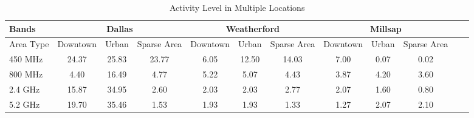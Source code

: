 %
%   
%




\begin{table}
\centering %
\begin{tabular}{|l|c|c|c|c|c|c|c|c|c|c|c|} %
\hline %
Bands     & \multicolumn{3}{c|}{Dallas} & \multicolumn{3}{c|}{Weatherford} & \multicolumn{3}{c|}{Millsap} \\%
\hline %
Area Type & Downtown & Urban & Sparse Area & Downtown &  Urban   & Sparse Area & Downtown & Urban & Sparse Area \\ %
\hline %
450 MHz &24.37	&25.83  &23.77	&6.05 &12.50  &14.03 & 7.00 & 0.07 & 0.02 \\      
\hline %
800 MHz &4.40 	&16.49  &4.77	&5.22&5.07 &4.43  & 3.87 & 4.20 & 3.60 \\      
\hline %
2.4 GHz &15.87 	&34.95  &2.60	&2.03&2.03 &2.77  & 2.07 & 1.60 & 0.80 \\      
\hline %
5.2 GHz &19.70	&35.46  &1.53	&1.93&1.93 &1.33  & 1.27 & 2.07 & 2.10 \\      
\hline %
\end{tabular}    
\label{tab:activitymeasurement}    
\caption{Activity Level in Multiple Locations} %
\vspace{-0.1in}
\end{table}    

